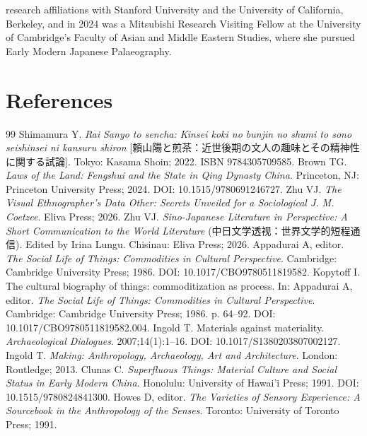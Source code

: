 \documentclass[numbers]{IntechOpen-Book}
\newcommand{\zh}[1]{{\CJKfontspec{Noto Serif CJK SC}\upshape #1}}
\begin{document}
\begin{backmatter}
\begin{authordetails}
research affiliations with Stanford University and the University of California, Berkeley, and in 2024 was a Mitsubishi Research Visiting Fellow at the University of Cambridge's Faculty of Asian and Middle Eastern Studies, where she pursued Early Modern Japanese Palaeography.
\end{authordetails}

\section*{References}

\begin{thebibliography}{99}
 Shimamura Y. \textit{Rai Sanyo to sencha: Kinsei koki no bunjin no shumi to sono seishinsei ni kansuru shiron} [\zh{頼山陽と煎茶：近世後期の文人の趣味とその精神性に関する試論}]. Tokyo: Kasama Shoin; 2022. ISBN 9784305709585.
 Brown TG. \textit{Laws of the Land: Fengshui and the State in Qing Dynasty China}. Princeton, NJ: Princeton University Press; 2024. DOI: 10.1515/9780691246727.
 Zhu VJ. \textit{The Visual Ethnographer's Data Other: Secrets Unveiled for a Sociological J. M. Coetzee}. Eliva Press; 2026.
 Zhu VJ. \textit{Sino-Japanese Literature in Perspective: A Short Communication to the World Literature} (\zh{中日文学透视：世界文学的短程通信}). Edited by Irina Lungu. Chisinau: Eliva Press; 2026.
 Appadurai A, editor. \textit{The Social Life of Things: Commodities in Cultural Perspective}. Cambridge: Cambridge University Press; 1986. DOI: 10.1017/CBO9780511819582.
 Kopytoff I. The cultural biography of things: commoditization as process. In: Appadurai A, editor. \textit{The Social Life of Things: Commodities in Cultural Perspective}. Cambridge: Cambridge University Press; 1986. p. 64--92. DOI: 10.1017/CBO9780511819582.004.
 Ingold T. Materials against materiality. \textit{Archaeological Dialogues}. 2007;14(1):1--16. DOI: 10.1017/S1380203807002127.
 Ingold T. \textit{Making: Anthropology, Archaeology, Art and Architecture}. London: Routledge; 2013.
 Clunas C. \textit{Superfluous Things: Material Culture and Social Status in Early Modern China}. Honolulu: University of Hawai'i Press; 1991. DOI: 10.1515/9780824841300.
 Howes D, editor. \textit{The Varieties of Sensory Experience: A Sourcebook in the Anthropology of the Senses}. Toronto: University of Toronto Press; 1991.

\end{thebibliography}
\end{backmatter}
\end{document}
